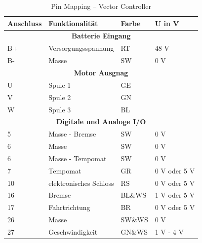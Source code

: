 \begin{table}[!ht]
	\centering
	\caption{Pin Mapping – Vector Controller}
	\label{Vector_Controller:tab:pinmapping}
	\begin{tabular}{lll|l}
		\hline
		\textbf{Anschluss}        & \textbf{Funktionalität} & \textbf{Farbe} & \textbf{U in V} \\ \hline
		\multicolumn{4}{c}{\textbf{Batterie Eingang}}                                          \\ \hline
		\multicolumn{1}{l|}{B+}   & Versorgungsspannung     & RT             & 48 V            \\
		\multicolumn{1}{l|}{B-}   & Masse                   & SW             & 0 V             \\ \hline
		\multicolumn{4}{c}{\textbf{Motor Ausgnag}}                                             \\ \hline
		\multicolumn{1}{l|}{U}    & Spule 1                 & GE             &                 \\
		\multicolumn{1}{l|}{V}    & Spule 2                 & GN             &                 \\
		\multicolumn{1}{l|}{W}    & Spule 3                 & BL             &                 \\ \hline
		\multicolumn{4}{c}{\textbf{Digitale und Analoge I/O}}                                  \\ \hline
		\multicolumn{1}{l|}{5}    & Masse - Bremse          & SW             & 0 V             \\
		\multicolumn{1}{l|}{6}    & Masse                   & SW             & 0 V             \\
		\multicolumn{1}{l|}{6}    & Masse - Tempomat        & SW             & 0 V             \\
		\multicolumn{1}{l|}{7}    & Tempomat                & GR             & 0 V oder 5 V    \\
		\multicolumn{1}{l|}{10}   & elektronisches Schloss  & RS             & 0 V oder 5 V    \\
		\multicolumn{1}{l|}{16}   & Bremse                  & BL\&WS         & 1 V oder 5 V    \\
		\multicolumn{1}{l|}{17}   & Fahrtrichtung           & BR             & 0 V oder 5 V    \\
		\multicolumn{1}{l|}{26}   & Masse                   & SW\&WS         & 0 V             \\
		\multicolumn{1}{l|}{27}   & Geschwindigkeit         & GN\&WS         & 1 V - 4 V       \\

\end{tabular}
\end{table}
